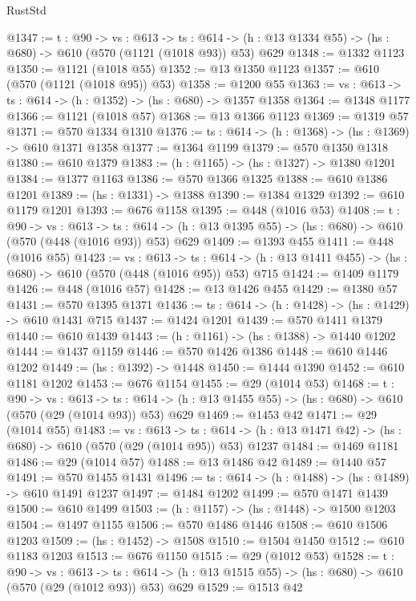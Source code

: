 \begin{lexlean}{RustStd}
\begin{coremodule}
@1347 := {t : @90} ->
  {vs : @613} ->
  {ts : @614} -> (h : @13 @1334 @55) -> (hs : @680) -> @610 (@570 (@1121 (@1018 @93)) @53) @629
@1348 := @1332 @1123
@1350 := @1121 (@1018 @55)
@1352 := @13 @1350 @1123
@1357 := @610 (@570 (@1121 (@1018 @95)) @53)
@1358 := @1200 @55
@1363 := {vs : @613} -> {ts : @614} -> (h : @1352) -> (hs : @680) -> @1357 @1358
@1364 := @1348 @1177
@1366 := @1121 (@1018 @57)
@1368 := @13 @1366 @1123
@1369 := @1319 @57
@1371 := @570 @1334 @1310
@1376 := {ts : @614} -> (h : @1368) -> (hs : @1369) -> @610 @1371 @1358
@1377 := @1364 @1199
@1379 := @570 @1350 @1318
@1380 := @610 @1379
@1383 := (h : @1165) -> (hs : @1327) -> @1380 @1201
@1384 := @1377 @1163
@1386 := @570 @1366 @1325
@1388 := @610 @1386 @1201
@1389 := (hs : @1331) -> @1388
@1390 := @1384 @1329
@1392 := @610 @1179 @1201
@1393 := @676 @1158
@1395 := @448 (@1016 @53)
@1408 := {t : @90} ->
  {vs : @613} ->
  {ts : @614} -> (h : @13 @1395 @55) -> (hs : @680) -> @610 (@570 (@448 (@1016 @93)) @53) @629
@1409 := @1393 @455
@1411 := @448 (@1016 @55)
@1423 := {vs : @613} ->
  {ts : @614} -> (h : @13 @1411 @455) -> (hs : @680) -> @610 (@570 (@448 (@1016 @95)) @53) @715
@1424 := @1409 @1179
@1426 := @448 (@1016 @57)
@1428 := @13 @1426 @455
@1429 := @1380 @57
@1431 := @570 @1395 @1371
@1436 := {ts : @614} -> (h : @1428) -> (hs : @1429) -> @610 @1431 @715
@1437 := @1424 @1201
@1439 := @570 @1411 @1379
@1440 := @610 @1439
@1443 := (h : @1161) -> (hs : @1388) -> @1440 @1202
@1444 := @1437 @1159
@1446 := @570 @1426 @1386
@1448 := @610 @1446 @1202
@1449 := (hs : @1392) -> @1448
@1450 := @1444 @1390
@1452 := @610 @1181 @1202
@1453 := @676 @1154
@1455 := @29 (@1014 @53)
@1468 := {t : @90} ->
  {vs : @613} ->
  {ts : @614} -> (h : @13 @1455 @55) -> (hs : @680) -> @610 (@570 (@29 (@1014 @93)) @53) @629
@1469 := @1453 @42
@1471 := @29 (@1014 @55)
@1483 := {vs : @613} ->
  {ts : @614} -> (h : @13 @1471 @42) -> (hs : @680) -> @610 (@570 (@29 (@1014 @95)) @53) @1237
@1484 := @1469 @1181
@1486 := @29 (@1014 @57)
@1488 := @13 @1486 @42
@1489 := @1440 @57
@1491 := @570 @1455 @1431
@1496 := {ts : @614} -> (h : @1488) -> (hs : @1489) -> @610 @1491 @1237
@1497 := @1484 @1202
@1499 := @570 @1471 @1439
@1500 := @610 @1499
@1503 := (h : @1157) -> (hs : @1448) -> @1500 @1203
@1504 := @1497 @1155
@1506 := @570 @1486 @1446
@1508 := @610 @1506 @1203
@1509 := (hs : @1452) -> @1508
@1510 := @1504 @1450
@1512 := @610 @1183 @1203
@1513 := @676 @1150
@1515 := @29 (@1012 @53)
@1528 := {t : @90} ->
  {vs : @613} ->
  {ts : @614} -> (h : @13 @1515 @55) -> (hs : @680) -> @610 (@570 (@29 (@1012 @93)) @53) @629
@1529 := @1513 @42

\end{coremodule}
\end{lexlean}

